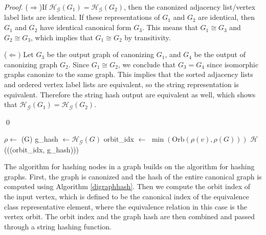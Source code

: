 \documentclass{svproc}
\begin{document}
\begin{proof}
($\Rightarrow$)If $\mathcal{H_G}(G_1)=\mathcal{H_G}(G_2)$, then the canonized adjacency list/vertex label lists are identical. If these representations of $G_1$ and $G_2$ are identical, then $G_1$ and $G_2$ have identical canonical form $G_3$. This means that $G_1 \cong G_3$ and $G_2 \cong G_3$, which implies that $G_1 \cong G_2$ by transitivity.


($\Leftarrow)$ Let $G_3$ be the output graph of canonizing $G_1$, and $G_4$ be the output of canonizing graph $G_2$. Since $G_1 \cong G_2$, we conclude that $G_3=G_4$ since isomorphic graphs canonize to the same graph. This implies that the sorted adjacency lists and ordered vertex label lists are equivalent, so the string representation is equivalent. Therefore the string hash output are equivalent as well, which shows that $\mathcal{H_G}(G_1)=\mathcal{H_G}(G_2)$.

\qed
\end{proof}

\begin{algorithm}
    \caption{Directed Graph Node Hash}\label{alg:digraph-node-hash}
    \begin{algorithmic}[1]
        \State $\rho \gets$ (G)
        \State g\_hash $\gets \mathcal{H_G}(G)$
        \State orbit\_idx $\gets$ $\min(\text{Orb}(\rho(v),\rho(G)))$
        \State \Return $\mathcal{H}$(((orbit\_idx, g\_hash)))
    \EndFunction
    \end{algorithmic}
\end{algorithm}

The algorithm for hashing nodes in a graph builds on the algorithm for hashing graphs. First, the graph is canonized and the hash of the entire canonical graph is computed using Algorithm \ref{digraphhash}. Then we compute the orbit index of the input vertex, which is defined to be the canonical index of the equivalence class representative element, where the equivalence relation in this case is the vertex orbit. The orbit index and the graph hash are then combined and passed through a string hashing function.
\end{document}

